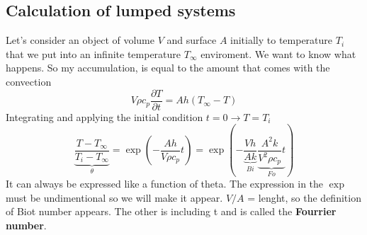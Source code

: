 	\subsection{Calculation of lumped systems}
		Let's consider an object of volume $V$ and surface $A$ initially to temperature $T_i$ that we put into an infinite temperature $T_\infty$ enviroment. We want to know what happens. So my accumulation, is equal to the amount that comes with the convection
		\begin{equation}
			V\rho c_p \frac{\partial T}{\partial t} = A h(T_\infty - T)
		\end{equation}
		Integrating and applying the initial condition $t = 0 \rightarrow T = T_i$
		\begin{equation}
			\underbrace{\frac{T-T_\infty}{T_i - T_\infty}}_{\theta} =
			 \exp \left( - \frac{Ah}{V\rho c_p}t \right) = 
			 \exp \left( - \underbrace{\frac{Vh}{Ak}}_{Bi} \underbrace{\frac{A^2k}{V^2\rho c_p}t}_{Fo} \right) 
		\end{equation}
It can always be expressed like a function of theta. 
The expression in the $\exp$ must be undimentional so we will make it appear. $V/A$ = lenght, so the definition of Biot number appears. The other is including t and is called the \textbf{Fourrier number}. 
	
	
	
	